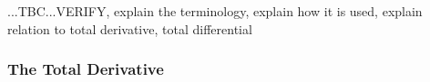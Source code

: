 ...TBC...VERIFY, explain the terminology, explain how it is used, explain relation to total derivative, total differential














%

\subsubsection{The Total Derivative}





